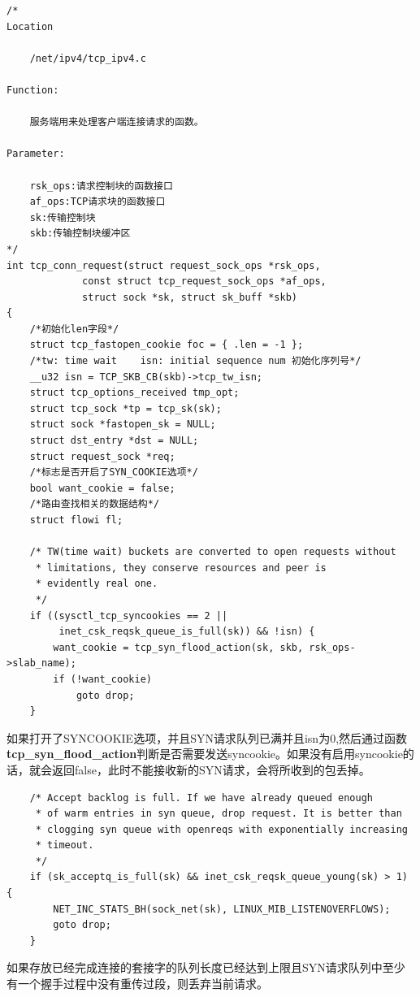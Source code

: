 \begin{verbatim}
/* 
Location

    /net/ipv4/tcp_ipv4.c

Function:

    服务端用来处理客户端连接请求的函数。

Parameter:

    rsk_ops:请求控制块的函数接口
    af_ops:TCP请求块的函数接口
    sk:传输控制块
    skb:传输控制块缓冲区
*/
int tcp_conn_request(struct request_sock_ops *rsk_ops,
             const struct tcp_request_sock_ops *af_ops,
             struct sock *sk, struct sk_buff *skb)
{
    /*初始化len字段*/
    struct tcp_fastopen_cookie foc = { .len = -1 };     
    /*tw: time wait    isn: initial sequence num 初始化序列号*/
    __u32 isn = TCP_SKB_CB(skb)->tcp_tw_isn;            
    struct tcp_options_received tmp_opt;
    struct tcp_sock *tp = tcp_sk(sk);
    struct sock *fastopen_sk = NULL;
    struct dst_entry *dst = NULL;
    struct request_sock *req;
    /*标志是否开启了SYN_COOKIE选项*/
    bool want_cookie = false;
    /*路由查找相关的数据结构*/ 
    struct flowi fl;                                   

    /* TW(time wait) buckets are converted to open requests without
     * limitations, they conserve resources and peer is
     * evidently real one.
     */
    if ((sysctl_tcp_syncookies == 2 ||
         inet_csk_reqsk_queue_is_full(sk)) && !isn) {
        want_cookie = tcp_syn_flood_action(sk, skb, rsk_ops->slab_name);
        if (!want_cookie)
            goto drop;
    }
\end{verbatim}
                如果打开了SYNCOOKIE选项，并且SYN请求队列已满并且isn为0,然后通过函数\textbf{tcp\_syn\_flood\_action}判断是否需要发送syncookie。如果没有启用syncookie的话，就会返回false，此时不能接收新的SYN请求，会将所收到的包丢掉。

\begin{verbatim}
    /* Accept backlog is full. If we have already queued enough
     * of warm entries in syn queue, drop request. It is better than
     * clogging syn queue with openreqs with exponentially increasing
     * timeout.
     */
    if (sk_acceptq_is_full(sk) && inet_csk_reqsk_queue_young(sk) > 1) {
        NET_INC_STATS_BH(sock_net(sk), LINUX_MIB_LISTENOVERFLOWS);
        goto drop;
    }
\end{verbatim}

        如果存放已经完成连接的套接字的队列长度已经达到上限且SYN请求队列中至少有一个握手过程中没有重传过段，则丢弃当前请求。

